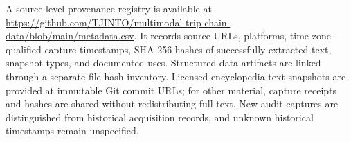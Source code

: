 A source-level provenance registry is available at \url{https://github.com/TJINTO/multimodal-trip-chain-data/blob/main/metadata.csv}. It records source URLs, platforms, time-zone-qualified capture timestamps, SHA-256 hashes of successfully extracted text, snapshot types, and documented uses. Structured-data artifacts are linked through a separate file-hash inventory. Licensed encyclopedia text snapshots are provided at immutable Git commit URLs; for other material, capture receipts and hashes are shared without redistributing full text. New audit captures are distinguished from historical acquisition records, and unknown historical timestamps remain unspecified.
